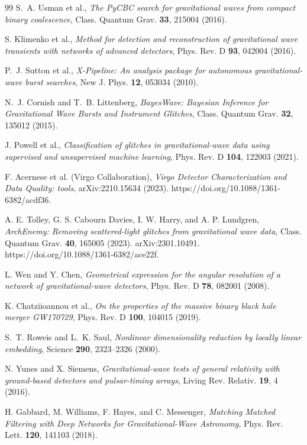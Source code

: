 \documentclass[11pt,a4paper]{article}
\begin{document}
\begin{thebibliography}{99}
S.~A. Usman et al.,
\emph{The PyCBC search for gravitational waves from compact binary coalescence},
Class. Quantum Grav. \textbf{33}, 215004 (2016).

S. Klimenko et al.,
\emph{Method for detection and reconstruction of gravitational wave transients with networks of advanced detectors},
Phys. Rev. D \textbf{93}, 042004 (2016).

P.~J. Sutton et al.,
\emph{X-Pipeline: An analysis package for autonomous gravitational-wave burst searches},
New J. Phys. \textbf{12}, 053034 (2010).

N.~J. Cornish and T.~B. Littenberg,
\emph{BayesWave: Bayesian Inference for Gravitational Wave Bursts and Instrument Glitches},
Class. Quantum Grav. \textbf{32}, 135012 (2015).

J. Powell et al.,
\emph{Classification of glitches in gravitational-wave data using supervised and unsupervised machine learning},
Phys. Rev. D \textbf{104}, 122003 (2021).

F. Acernese et al. (Virgo Collaboration),
\emph{Virgo Detector Characterization and Data Quality: tools},
arXiv:2210.15634 (2023). https://doi.org/10.1088/1361-6382/acdf36.

A. E. Tolley, G. S. Cabourn Davies, I. W. Harry, and A. P. Lundgren,
\emph{ArchEnemy: Removing scattered-light glitches from gravitational wave data},
Class. Quantum Grav. \textbf{40}, 165005 (2023). arXiv:2301.10491. https://doi.org/10.1088/1361-6382/ace22f.

L. Wen and Y. Chen,
\emph{Geometrical expression for the angular resolution of a network of gravitational-wave detectors},
Phys. Rev. D \textbf{78}, 082001 (2008).

K. Chatziioannou et al.,
\emph{On the properties of the massive binary black hole merger GW170729},
Phys. Rev. D \textbf{100}, 104015 (2019).

S.~T. Roweis and L.~K. Saul,
\emph{Nonlinear dimensionality reduction by locally linear embedding},
Science \textbf{290}, 2323–2326 (2000).

N. Yunes and X. Siemens,
\emph{Gravitational-wave tests of general relativity with ground-based detectors and pulsar-timing arrays},
Living Rev. Relativ. \textbf{19}, 4 (2016).

H. Gabbard, M. Williams, F. Hayes, and C. Messenger,
\emph{Matching Matched Filtering with Deep Networks for Gravitational-Wave Astronomy},
Phys. Rev. Lett. \textbf{120}, 141103 (2018).

\end{thebibliography}

\end{document}
